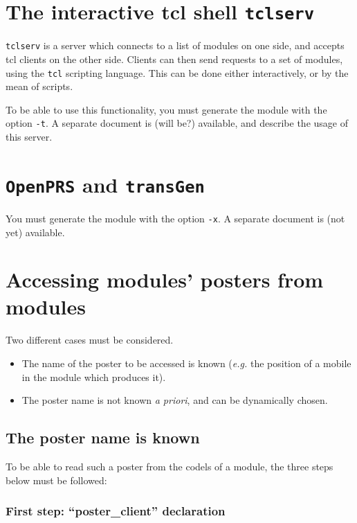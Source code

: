 \section{The interactive tcl shell {\tt tclserv}}
\label{sec|tcl}

{\tt tclserv} is  a server which  connects to  a  list of modules on  one
side, and accepts  tcl clients on  the other side.  Clients can then send
requests to  a   set   of   modules,  using the    {\tt  tcl}   scripting
language. This  can  be done  either interactively,  or  by the  mean  of
scripts.

To be able to use  this functionality, you must  generate the module with
the  option {\tt -t}.  A separate document   is (will be?) available, and
describe the usage of this server.


\section{{\tt OpenPRS} and {\tt transGen}}
\label{sec|propice}

You must generate the module with the option {\tt -x}.
A separate document is (not yet) available.


\section{Accessing modules' posters from modules}

Two different cases must be considered.
\begin{itemize}
\item The name of the poster to be accessed is known ({\em e.g.} the
position of a mobile in the module which produces it).
\item The poster name is not known {\em a priori}, and can be dynamically
chosen.
\end{itemize}

\subsection{The poster name is known}

To be able to read such  a poster from the  codels of a module, the three
steps below must be followed:

\subsubsection{First step: ``poster\_client'' declaration}

